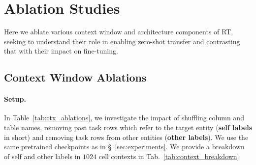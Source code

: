 
\section{Ablation Studies}
\label{sec:analysis}

Here we ablate various
context window and architecture components of RT,
seeking to understand their role in
enabling zero-shot transfer and
contrasting that with their impact on fine-tuning.

\subsection{Context Window Ablations}
\label{sec:context_ablation}




\paragraph{Setup.}
In Table~\ref{tab:ctx_ablations},
we investigate the impact of 
shuffling column and table names,
removing past task rows which refer to the target entity
(\textbf{self labels} in short)
and removing task rows from other entities
(\textbf{other labels}).
We use the same pretrained checkpoints as in \S~\ref{sec:experiments}.
We provide a breakdown of self and other labels in $1024$ cell contexts
in Tab.~\ref{tab:context_breakdown}.

